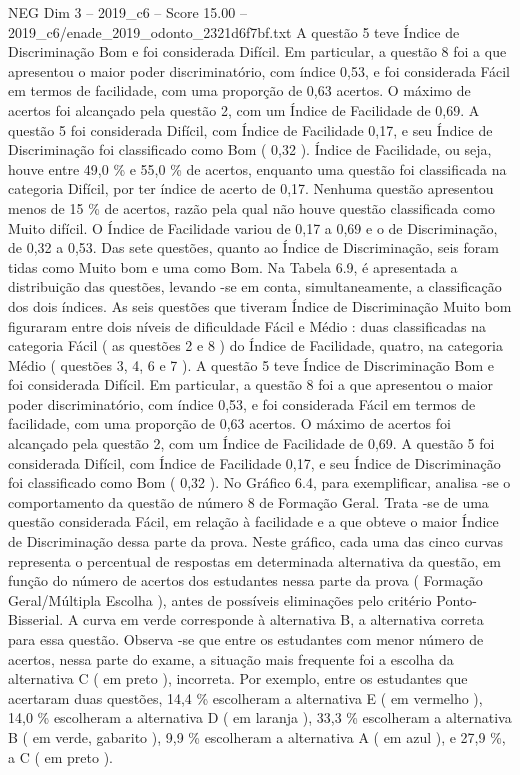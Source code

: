 \begin{textsample}{NEG Dim 3 – 2019\_c6 – Score 15.00 – 2019\_c6/enade\_2019\_odonto\_2321d6f7bf.txt}
A questão 5 teve Índice de Discriminação Bom e foi considerada Difícil.
Em particular, a questão 8 foi a que apresentou o maior poder discriminatório, com índice 0,53, e foi considerada Fácil em termos de facilidade, com uma proporção de 0,63 acertos.
O máximo de acertos foi alcançado pela questão 2, com um Índice de Facilidade de 0,69.
A questão 5 foi considerada Difícil, com Índice de Facilidade 0,17, e seu Índice de Discriminação foi classificado como Bom ( 0,32 ).
Índice de Facilidade, ou seja, houve entre 49,0 \% e 55,0 \% de acertos, enquanto uma questão foi classificada na categoria Difícil, por ter índice de acerto de 0,17.
Nenhuma questão apresentou menos de 15 \% de acertos, razão pela qual não houve questão classificada como Muito difícil.
O Índice de Facilidade variou de 0,17 a 0,69 e o de Discriminação, de 0,32 a 0,53.
Das sete questões, quanto ao Índice de Discriminação, seis foram tidas como Muito bom e uma como Bom.
Na Tabela 6.9, é apresentada a distribuição das questões, levando -se em conta, simultaneamente, a classificação dos dois índices.
As seis questões que tiveram Índice de Discriminação Muito bom figuraram entre dois níveis de dificuldade Fácil e Médio : duas classificadas na categoria Fácil ( as questões 2 e 8 ) do Índice de Facilidade, quatro, na categoria Médio ( questões 3, 4, 6 e 7 ).
A questão 5 teve Índice de Discriminação Bom e foi considerada Difícil.
Em particular, a questão 8 foi a que apresentou o maior poder discriminatório, com índice 0,53, e foi considerada Fácil em termos de facilidade, com uma proporção de 0,63 acertos.
O máximo de acertos foi alcançado pela questão 2, com um Índice de Facilidade de 0,69.
A questão 5 foi considerada Difícil, com Índice de Facilidade 0,17, e seu Índice de Discriminação foi classificado como Bom ( 0,32 ).
No Gráfico 6.4, para exemplificar, analisa -se o comportamento da questão de número 8 de Formação Geral.
Trata -se de uma questão considerada Fácil, em relação à facilidade e a que obteve o maior Índice de Discriminação dessa parte da prova.
Neste gráfico, cada uma das cinco curvas representa o percentual de respostas em determinada alternativa da questão, em função do número de acertos dos estudantes nessa parte da prova ( Formação Geral/Múltipla Escolha ), antes de possíveis eliminações pelo critério Ponto-Bisserial.
A curva em verde corresponde à alternativa B, a alternativa correta para essa questão.
Observa -se que entre os estudantes com menor número de acertos, nessa parte do exame, a situação mais frequente foi a escolha da alternativa C ( em preto ), incorreta.
Por exemplo, entre os estudantes que acertaram duas questões, 14,4 \% escolheram a alternativa E ( em vermelho ), 14,0 \% escolheram a alternativa D ( em laranja ), 33,3 \% escolheram a alternativa B ( em verde, gabarito ), 9,9 \% escolheram a alternativa A ( em azul ), e 27,9 \%, a C ( em preto ).

\end{textsample}
